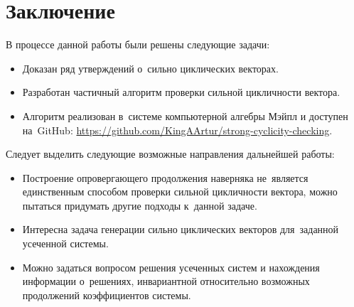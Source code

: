 \section{Заключение}

В процессе данной работы были решены следующие задачи:

\begin{itemize}
	\item
		Доказан ряд утверждений о~сильно циклических векторах.
	\item
		Разработан частичный алгоритм проверки сильной цикличности вектора.
	\item
		Алгоритм реализован в~системе компьютерной алгебры Мэйпл и доступен на~GitHub:
		\url{https://github.com/KingAArtur/strong-cyclicity-checking}.
\end{itemize}

Следует выделить следующие возможные направления дальнейшей работы:

\begin{itemize}
	\item
		Построение опровергающего продолжения наверняка не~является единственным способом проверки сильной цикличности вектора,
        можно пытаться придумать другие подходы к~данной задаче.
	\item
		Интересна задача генерации сильно циклических векторов для~заданной усеченной системы.
	\item
		Можно задаться вопросом решения усеченных систем и нахождения информации о~решениях,
        инвариантной относительно возможных продолжений коэффициентов системы.
\end{itemize}
